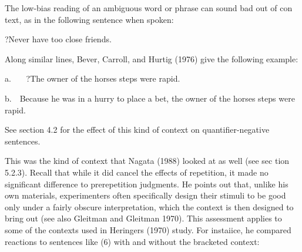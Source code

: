 \begin{styleTextbody}
The low-bias reading of an ambiguous word or phrase can sound bad out of con\- text, as in the following sentence when spoken:
\end{styleTextbody}


\setcounter{listWWNumxxxleveli}{1}
\begin{listWWNumxxxleveli}
\item 
\begin{styleTextbody}
?Never have too close friends.
\end{styleTextbody}


\end{listWWNumxxxleveli}
\begin{styleTextbody}
Along similar lines, Bever, Carroll, and Hurtig (1976) give the following example:
\end{styleTextbody}


\begin{listWWNumxxxleveli}
\item 
\begin{styleTextbody}
a. \ \ \ ?The owner of the horse{\textquotesingle}s steps were rapid.
\end{styleTextbody}


\end{listWWNumxxxleveli}
\begin{styleTextbody}
b.\ \ Because he was in a hurry to place a bet, the owner of the horse{\textquotesingle}s steps were rapid.
\end{styleTextbody}


\begin{styleTextbody}
See section 4.2 for the effect of this kind of context on quantifier-negative sentences.
\end{styleTextbody}


\begin{styleTextbody}
This was the kind of context that Nagata (1988) looked at as well (see sec\- tion 5.2.3). Recall that while it did cancel the effects of repetition, it made no significant difference to prerepetition judgments. He points out that, unlike his own materials, experimenters often specifically design their stimuli to be good only under a fairly obscure interpretation, which the context is then designed to bring out (see also Gleitman and Gleitman 1970). This assessment applies to some of the contexts used in Heringer{\textquotesingle}s (1970) study. For instaiice, he compared reactions to sentences like (6) with and without the bracketed context:
\end{styleTextbody}


